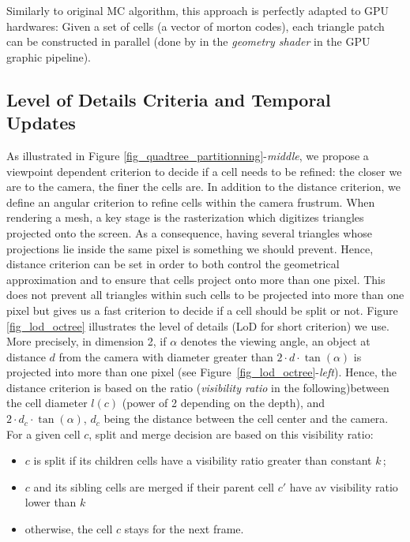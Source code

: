 \documentclass{llncs}
\begin{document}
Similarly to original MC algorithm, this approach is perfectly adapted
to GPU hardwares: Given a set of cells (a vector of morton codes),
each triangle patch can be constructed in parallel (done by
in the \emph{geometry shader} in the GPU graphic pipeline).

\subsection{Level of Details Criteria and Temporal Updates}


As illustrated in Figure
\ref{fig_quadtree_partitionning}-\emph{middle}, we propose a viewpoint
dependent criterion to decide if a cell needs to be refined: the
closer we are to the camera, the finer the cells are. In addition to
the distance criterion, we define an angular criterion to refine cells
within the camera frustrum. When rendering a mesh, a key stage is the
rasterization which digitizes triangles projected onto the
screen. As a consequence, having several triangles whose projections
lie inside the same pixel is something we should prevent. Hence,
distance criterion can be set in order to both control the geometrical
approximation and to ensure that cells project onto more than one
pixel. This does not prevent all triangles within such cells to be
projected into more than one pixel but gives us a fast criterion to
decide if a cell should be split or not.  Figure \ref{fig_lod_octree}
illustrates the level of details (LoD for short criterion) we
use. More precisely, in dimension 2, if $\alpha$ denotes the viewing
angle, an object at distance $d$ from the camera with diameter greater than
 $2\cdot d\cdot\tan(\alpha)$
 is projected into more than one pixel
(see Figure~\ref{fig_lod_octree}-\emph{left}). Hence, the distance
criterion is based on the ratio (\emph{visibility ratio} in the
following)between the cell diameter $l(c)$ (power of 2 depending on
the depth), and
$2\cdot d_c\cdot\tan(\alpha)$, $d_c$ being the distance between the cell center and the camera. For a given cell $c$,
split and merge decision are based on this visibility ratio:
\begin{itemize}
\item $c$ is split if its children cells have a visibility ratio
  greater than  constant $k$\,;
\item $c$ and its sibling cells are merged if their parent cell $c'$
  have av visibility ratio lower than $k$\;
\item otherwise, the cell $c$ stays for the next frame.
\end{itemize}
\end{document}
